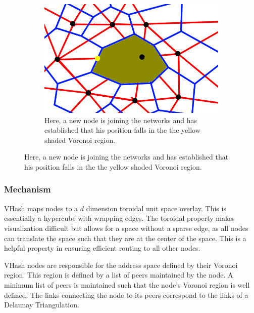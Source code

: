 \documentclass{article}
\begin{document}
\begin{figure}
\begin{minipage}{0.5\textwidth}

\begin{figure}[H]
\vspace{-30pt}
    \includegraphics[width=\linewidth]{voronoi-churn4}

    \caption
{
Here, a new node is joining the networks and has established that his position falls in the the yellow shaded Voronoi region.}
\end{figure}
    \end{minipage}
  \end{figure}



\subsubsection*{Mechanism}
VHash maps nodes to a $d$ dimension toroidal unit space overlay. This is essentially a hypercube with wrapping edges. The toroidal property makes visualization difficult but allows for a space without a sparse edge, as all nodes can translate the space such that they are at the center of the space.  This is a helpful property in ensuring efficient routing to all other nodes.

VHash nodes are responsible for the address space defined by their Voronoi region. This region is defined by a list of peers maintained by the node. A minimum list of peers is maintained such that the node's Voronoi region is well defined. The links connecting the node to its peers correspond to the links of a Delaunay Triangulation.
\end{document}
